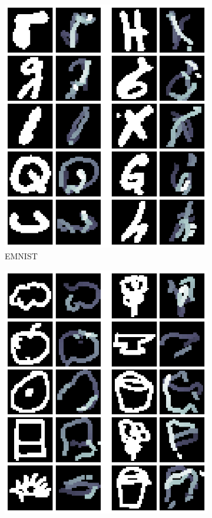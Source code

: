 \begin{figure}[!ht]
\begin{subfigure}[b]{0.3\textwidth}
        \includegraphics[width=\textwidth]{images/resultate/physics-base-emnist.png}
        \caption{EMNIST}
    \end{subfigure}
    \begin{subfigure}[b]{0.3\textwidth}
        \centering
        \includegraphics[width=\textwidth]{images/resultate/physics-base-quickdraw.png}

\end{subfigure}
\end{figure}
